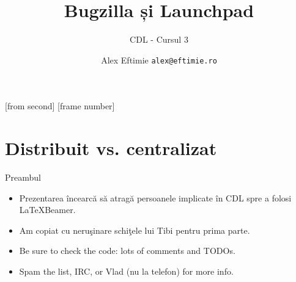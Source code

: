 \documentclass{beamer}
\title[Launchpad]{Bugzilla și Launchpad}
\subtitle{CDL - Cursul 3}
\institute{ROSEdu}
\author{Alex Eftimie \texttt{alex@eftimie.ro}}
\begin{document}
[from second]
[frame number]

\frame{\titlepage}

\frame{\tableofcontents}

\section{Distribuit vs. centralizat}

\frame{\tableofcontents[currentsection]}

\begin{frame}{Preambul}
\begin{itemize} %
\item Prezentarea încearcă să atragă persoanele implicate în CDL spre a folosi
\LaTeX Beamer.
\item Am copiat cu neruşinare schiţele lui Tibi pentru prima parte.
\item Be sure to check the code: lots of comments and TODOs.
\item Spam the list, IRC, or Vlad (nu la telefon) for more info.
\end{itemize}
\end{frame}
\end{document}
